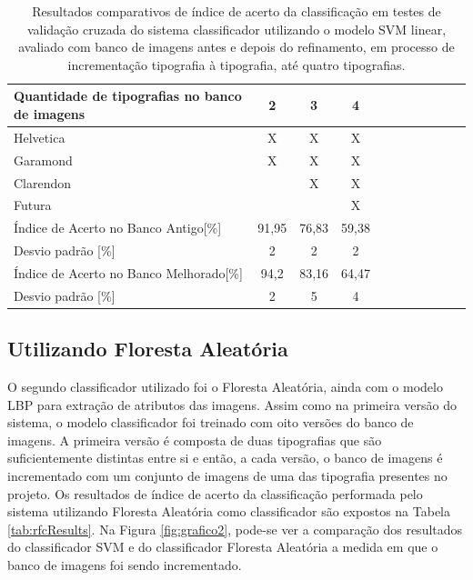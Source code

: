 \begin{table}[H]
 \centering
 \begin{tabular}{l|c|c|c|c|c|c|c|c|c|c}
    Quantidade de tipografias  no banco de imagens  & 2 & 3 & 4 \\
	\hline
	Helvetica & X & X & X  \\
	Garamond & X & X & X \\
	Clarendon &  & X & X \\
	Futura &  &  & X  \\
	\hline
	Índice de Acerto no Banco Antigo[\%] & 91,95 & 76,83 & 59,38 \\
	Desvio padrão [\%] & 2 & 2 & 2\\
	\hline
	Índice de Acerto no Banco Melhorado[\%] & 94,2 & 83,16 & 64,47 \\
	Desvio padrão [\%] & 2 & 5 & 4 \\
 \end{tabular}
 \caption{Resultados comparativos de índice de acerto da classificação em testes de validação cruzada do sistema classificador utilizando o modelo SVM linear, avaliado com banco de imagens antes e depois do refinamento, em processo de incrementação tipografia à tipografia, até quatro tipografias.}
 \label{tab:svmResults2}
\end{table}

\subsection{Utilizando Floresta Aleatória}

O segundo classificador utilizado foi o Floresta Aleatória, ainda com o modelo LBP para extração de atributos das imagens. Assim como na primeira versão do sistema, o modelo classificador foi treinado com oito versões do banco de imagens. A primeira versão é composta de duas tipografias que são suficientemente distintas entre si e então, a cada versão, o banco de imagens é incrementado com um conjunto de imagens de uma das tipografia presentes no projeto. Os resultados de índice de acerto da classificação performada pelo sistema utilizando Floresta Aleatória como classificador são expostos na Tabela \ref{tab:rfcResults}. Na Figura \ref{fig:grafico2}, pode-se ver a comparação dos resultados do classificador SVM e do classificador Floresta Aleatória a medida em que o banco de imagens foi sendo incrementado.



